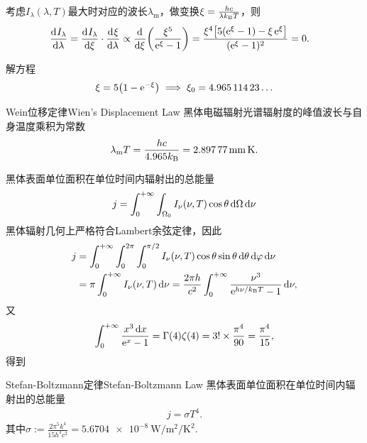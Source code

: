 考虑$I_\lambda(\lambda,T)$最大时对应的波长$\lambda_{\mathrm m}$，做变换$\xi=\frac{hc}{\lambda k_{\mathrm B} T}$，则
\begin{align*}
	\frac{\mathrm{d}^{{}}I_\lambda}{\mathrm{d}{\lambda}^{{}}} & =\frac{\mathrm{d}^{{}}I_\lambda}{\mathrm{d}{\xi}^{{}}}\cdot\frac{\mathrm{d}^{{}}\xi}{\mathrm{d}{\lambda}^{{}}}\propto\frac{\mathrm{d}^{{}}}{\mathrm{d}{\xi}^{{}}}\biggl(\frac{\xi^5}{\mathop{}\!\mathrm{e}^\xi-1}\biggr)
	=\frac{\xi^4\bigl[5(\mathop{}\!\mathrm{e}^\xi-1)-\xi\mathop{}\!\mathrm{e}^\xi\bigr]}{(\mathop{}\!\mathrm{e}^\xi-1)^2}=0.
\end{align*}

解方程
\[
	\xi=5\bigl(1-\mathop{}\!\mathrm{e}^{-\xi}\bigr)\implies\xi_0=\num{4.96511423}\ldots
\]
\begin{theorem}{Wein位移定律}{Wien's Displacement Law}
	黑体电磁辐射光谱辐射度的峰值波长与自身温度乘积为常数
	\begin{align}
		\lambda_\mathrm m T=\frac{hc}{4.965\kB}=\SI{2.89777}{\mm\K}.
	\end{align}
\end{theorem}

黑体表面单位面积在单位时间内辐射出的总能量
\[
	j=\int_0^{+\infty}\int_{\Omega_0}I_\nu(\nu,T)\cos\theta\mathop{}\!\mathrm{d}\Omega\mathop{}\!\mathrm{d}\nu
\]
黑体辐射几何上严格符合Lambert余弦定律，因此
\begin{align*}
	j & =\int_0^{+\infty}\int_0^{2\pi}\int_0^{\pi/2}I_\nu(\nu,T)\cos\theta\sin\theta\mathop{}\!\mathrm{d}\theta\mathop{}\!\mathrm{d}\varphi\mathop{}\!\mathrm{d}\nu \\
	  & =\pi\int_0^{+\infty} I_\nu(\nu,T)\mathop{}\!\mathrm{d}\nu=\frac{2\pi h}{c^2}\int_0^{+\infty}\frac{\nu^3}{\mathop{}\!\mathrm{e}^{h\nu/k_{\mathrm B} T}-1}\mathop{}\!\mathrm{d}\nu,
\end{align*}
又
\[
	\int_0^{+\infty}\frac{x^3\mathop{}\!\mathrm{d} x}{\mathop{}\!\mathrm{e}^ x-1}=\Gamma(4)\zeta(4)=3!\times\frac{\pi^4}{90}=\frac{\pi^4}{15},
\]
得到
\begin{theorem}{Stefan-Boltzmann定律}{Stefan-Boltzmann Law}
	黑体表面单位面积在单位时间内辐射出的总能量
	\begin{align}
		j=\sigma T^4.
	\end{align}
	其中$\sigma:=\frac{2\pi^5k^4}{15h^3c^2}=\SI{5.6704e-8}{\W\per\m\squared\per\K\squared}.$
\end{theorem}
